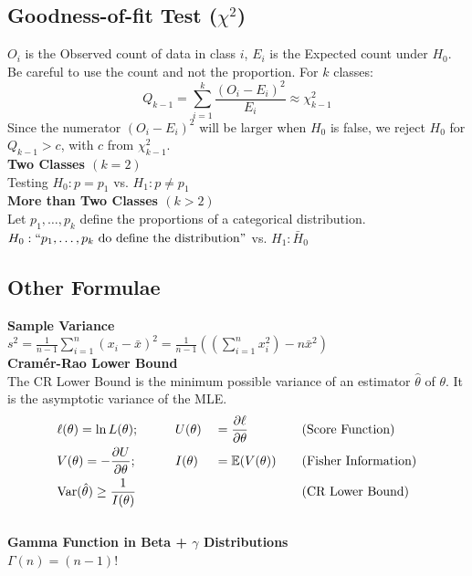 \documentclass{article}
\begin{document}
\begin{multicols*}{2}
\subsection*{Goodness-of-fit Test ($\chi^{2}$)}
$O_{i}$ is the Observed count of data in class $i$, $E_{i}$ is the Expected count under $H_{0}$. Be careful to use the count and not the proportion. For $k$ classes:
$$Q_{k-1} = \sum_{i=1}^{k} \frac{(O_{i} - E_{i})^{2}}{E_{i}} \approx \chi^{2}_{k-1}$$
Since the numerator $(O_{i} - E_{i})^{2}$ will be larger when $H_{0}$ is false, we reject $H_{0}$ for $Q_{k-1} > c$, with $c$ from $\chi^{2}_{k-1}$.\\
\textbf{Two Classes $(k = 2)$}\\
Testing $H_{0}: p = p_{1}$ vs. $H_{1}: p \neq p_{1}$\\
\textbf{More than Two Classes $(k > 2)$}\\
Let $p_{1}, \dots, p_{k}$ define the proportions of a categorical distribution. $H_{0}: ``p_{1}, \dots, p_{k} \mbox{ do define the distribution}"$ vs. $H_{1}: \bar{H}_{0}$

\subsection*{Other Formulae}
\textbf{Sample Variance}\\
$s^2 = \frac{1}{n-1} \sum_{i=1}^{n} (x_{i}-\bar{x})^2 = \frac{1}{n-1} \left( \left( \sum_{i=1}^{n} x_{i}^2 \right) -n \bar{x}^2 \right)$\\
\textbf{Cramér-Rao Lower Bound}\\
The CR Lower Bound is the minimum possible variance of an estimator $\hat{\theta}$ of $\theta$. It is the asymptotic variance of the MLE.
\vspace{-0.2cm}
{\setlength{\mathindent}{0.5cm}
\begin{alignat*}{4}
    &\ell(\theta) = \ln L(\theta); &&\qquad U(\theta) &&= \frac{\partial \ell}{\partial \theta} &&\mbox{\quad (Score Function)}\\
    &V(\theta) = -\frac{\partial U}{\partial \theta}; &&\qquad I(\theta) &&= \mathbb{E}(V(\theta)) &&\mbox{\quad (Fisher Information)}\\
    &\mbox{Var}(\hat{\theta}) \geq \frac{1}{I(\theta)} && && &&\mbox{\quad (CR Lower Bound)}
\end{alignat*} \vspace{-0.5cm}}\\
\noindent \textbf{Gamma Function in Beta + $\gamma$ Distributions}\\
$\Gamma(n) = (n-1)!$
\end{multicols*}
\end{document}
